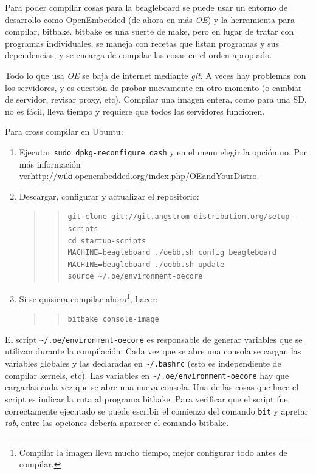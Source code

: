\documentclass[main]{subfiles}
\begin{document}
Para poder compilar cosas para la beagleboard se puede usar un entorno de desarrollo como OpenEmbedded (de ahora en más \textit{OE}) y la herramienta para compilar, bitbake. bitbake es una suerte de make, pero en lugar de tratar con programas individuales, se maneja con recetas que listan programas y sus dependencias, y se encarga de compilar las cosas en el orden apropiado.

Todo lo que usa \textit{OE} se baja de internet mediante \textit{git}. A veces hay problemas con los servidores, y es cuestión de probar nuevamente en otro momento (o cambiar de servidor, revisar proxy, etc). Compilar una imagen entera, como para una SD, no es fácil, lleva tiempo y requiere que todos los servidores funcionen.

Para cross compilar en Ubuntu:
\begin{enumerate}
\item Ejecutar \verb+sudo dpkg-reconfigure dash+ y en el menu elegir la opción no. Por más información ver\newline\url{http://wiki.openembedded.org/index.php/OEandYourDistro}.
\item Descargar, configurar y actualizar el repositorio:
\begin{quote}
\begin{quote}
\begin{verbatim}
git clone git://git.angstrom-distribution.org/setup-scripts
cd startup-scripts
MACHINE=beagleboard ./oebb.sh config beagleboard
MACHINE=beagleboard ./oebb.sh update
source ~/.oe/environment-oecore
\end{verbatim}
\end{quote}
\end{quote}
\item Si se quisiera compilar ahora\footnote{Compilar la imagen lleva mucho tiempo, mejor configurar todo antes de compilar.}, hacer:
\begin{quote}
\begin{quote}
\begin{verbatim}
bitbake console-image
\end{verbatim}
\end{quote}
\end{quote}
\end{enumerate}

El script \verb+~/.oe/environment-oecore+ es responsable de generar variables que se utilizan durante la compilación. Cada vez que se abre una consola se cargan las variables globales y las declaradas en \verb+~/.bashrc+ (esto es independiente de compilar kernels, etc). Las variables en \verb+~/.oe/environment-oecore+ hay que cargarlas cada vez que se abre una nueva consola. Una de las cosas que hace el script es indicar la ruta al programa bitbake. Para verificar que el script fue correctamente ejecutado se puede escribir el comienzo del comando \verb+bit+ y apretar \textit{tab}, entre las opciones debería aparecer el comando bitbake.
\end{document}
